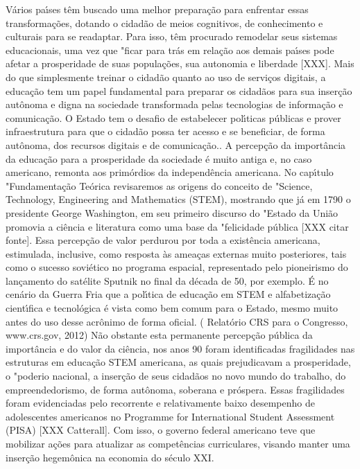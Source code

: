 \documentclass[
12pt,		%
openright,	%
twoside,  %
a4paper,			%
chapter=TITLE,		%
english,			%
french,				%
spanish,			%
brazil				%
]{USPSC-classe/USPSC}
\begin{document}
V\'arios pa\'{\i}ses t\^em buscado uma melhor prepara\c{c}\~ao para enfrentar essas transforma\c{c}\~oes, dotando o cidad\~ao de meios cognitivos, de conhecimento e culturais para se readaptar. Para isso, t\^em procurado remodelar seus sistemas educacionais, uma vez que "ficar para tr\'as em rela\c{c}\~ao aos demais pa\'{\i}ses pode afetar a prosperidade de suas popula\c{c}\~oes, sua autonomia e liberdade [XXX]. 
Mais do que simplesmente treinar o cidad\~ao quanto ao uso  de servi\c{c}os digitais, a educa\c{c}\~ao tem um papel fundamental para preparar os cidad\~aos para sua inser\c{c}\~ao aut\^onoma e digna na sociedade transformada pelas tecnologias de informa\c{c}\~ao e comunica\c{c}\~ao. O Estado tem o desafio de estabelecer pol\'{\i}ticas p\'ublicas e prover infraestrutura para que o cidad\~ao possa ter acesso e se beneficiar, de forma aut\^onoma, dos recursos digitais e de comunica\c{c}\~ao..
A percep\c{c}\~ao da import\^ancia da educa\c{c}\~ao para a prosperidade da sociedade \'e muito antiga e, no caso americano, remonta aos prim\'ordios da independ\^encia americana. 
No cap\'{\i}tulo "Fundamenta\c{c}\~ao Te\'orica revisaremos as origens do conceito de "Science, Technology, Engineering and Mathematics (STEM), mostrando que j\'a em 1790 o  presidente George Washington, em seu primeiro discurso do "Estado da Uni\~ao promovia a ci\^encia e literatura como uma base da "felicidade p\'ublica [XXX citar fonte]. Essa percep\c{c}\~ao de valor perdurou por toda a exist\^encia americana, estimulada, inclusive, como resposta \`as amea\c{c}as externas muito posteriores, tais como o sucesso sovi\'etico no programa espacial, representado pelo pioneirismo do lan\c{c}amento do sat\'elite Sputnik no final da d\'ecada de 50, por exemplo. \'E no cen\'ario da Guerra Fria que a pol\'{\i}tica de educa\c{c}\~ao em STEM e alfabetiza\c{c}\~ao  cient\'{\i}fica e tecnol\'ogica  \'e vista como bem comum para o Estado, mesmo muito antes do uso desse acr\^onimo de forma oficial. ( Relat\'orio CRS para o Congresso, www.crs.gov, 2012) 
N\~ao obstante esta permanente percep\c{c}\~ao p\'ublica da import\^ancia e do valor da ci\^encia, nos anos 90 foram identificadas fragilidades nas estruturas em educa\c{c}\~ao STEM americana, as quais prejudicavam a prosperidade, o "poderio nacional, a inser\c{c}\~ao de seus cidad\~aos no novo mundo do trabalho, do empreendedorismo, de forma aut\^onoma, soberana  e pr\'ospera. Essas fragilidades foram evidenciadas pelo recorrente e relativamente baixo desempenho de adolescentes americanos no Programme for International Student Assessment (PISA) [XXX Catterall]. Com isso, o governo federal americano teve que mobilizar a\c{c}\~oes para atualizar as compet\^encias curriculares, visando manter uma inser\c{c}\~ao hegem\^onica na economia do s\'eculo XXI. 
\end{document}
